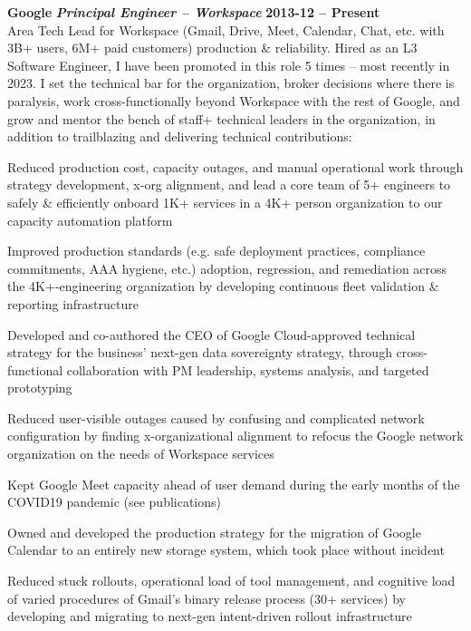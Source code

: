 \documentclass[margin,line]{resume}
\begin{document}
\begin{resume}
  \textbf{Google}
  \vspace{1mm}
  \vspace{0mm}%
  \textsl \textbf{Principal Engineer --  Workspace} \hfill \textbf{2013-12 -- Present}
  \\ Area Tech Lead for Workspace (Gmail, Drive, Meet, Calendar, Chat, etc. with 3B+ users, 6M+ paid customers) production {\&} reliability. Hired as an L3 Software Engineer, I have been promoted in this role 5 times – most recently in 2023.
  I set the technical bar for the organization, broker decisions where there is paralysis, work cross-functionally beyond Workspace with the rest of Google, and grow and mentor the bench of staff+ technical leaders in the organization,
  in addition to trailblazing and delivering technical contributions:
  \vspace{1mm}
  \begin{list2}
    \item Reduced production cost, capacity outages, and manual operational work through strategy development, x-org alignment, and lead a core team of 5+ engineers to safely {\&} efficiently onboard 1K+ services in a 4K+ person organization to our capacity automation platform
    \item Improved production standards (e.g. safe deployment practices, compliance commitments, AAA hygiene, etc.) adoption, regression, and remediation across the 4K+-engineering organization by developing continuous fleet validation {\&} reporting infrastructure
    \item Developed and co-authored the CEO of Google Cloud-approved technical strategy for the business’ next-gen data sovereignty strategy, through cross-functional collaboration with PM leadership, systems analysis, and targeted prototyping
    \item Reduced user-visible outages caused by confusing and complicated network configuration
    by finding x-organizational alignment to refocus the Google network organization on the needs
    of Workspace services
    \item Kept Google Meet capacity ahead of user demand during the early months of the COVID19 pandemic (see publications)
    \item Owned and developed the production strategy for the migration of Google Calendar to an entirely new storage system, which took place without incident
    \item Reduced stuck rollouts, operational load of tool management, and cognitive load of varied procedures of Gmail’s binary release process (30+ services) by developing and migrating to next-gen intent-driven rollout infrastructure
  \end{list2}\vspace{-0.5mm}


\end{resume}
\end{document}
